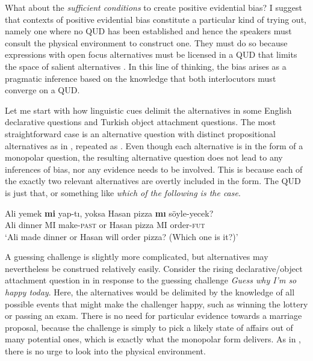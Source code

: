 \documentclass[output=paper,colorlinks,citecolor=brown]{langscibook}
\begin{document}
What about the \textit{sufficient conditions} to create positive evidential bias? I suggest that contexts of positive evidential bias constitute a particular kind of trying out, namely one where no QUD has been established and hence the speakers must consult the physical environment to construct one. They must do so because expressions with open focus alternatives must be licensed in a QUD that limits the space of salient alternatives \citep{Roberts:1996, biezma-rawlins12}. In this line of thinking, the bias arises as a pragmatic inference based on the knowledge that both interlocutors must converge on a QUD.

Let me start with how linguistic cues delimit the alternatives in some English declarative questions and Turkish object attachment questions. The most straightforward case is an alternative question with distinct propositional alternatives as in , repeated as . Even though each alternative is in the form of a monopolar question, the resulting alternative question does not lead to any inferences of bias, nor any evidence needs to be involved. This is because each of the exactly two relevant alternatives are overtly included in the form. The QUD is just that, or something like \textit{which of the following is the case}. 

\ea\label{43}
\gll Ali yemek \textbf{mi} yap-tı, yoksa Hasan pizza \textbf{mı} s\"oyle-yecek?\\
Ali dinner MI make-\textsc{past} or Hasan pizza MI order-\textsc{fut}\\
\glt `Ali made dinner or Hasan will order pizza? (Which one is it?)' 
\z

A guessing challenge is slightly more complicated, but alternatives may nevertheless be construed relatively easily. Consider the rising declarative/object attachment question in  in response to the guessing challenge \textit{Guess why I'm so happy today}. Here, the alternatives would be delimited by the knowledge of all possible events that might make the challenger happy, such as winning the lottery or passing an exam. There is no need for particular evidence towards a marriage proposal, because the challenge is simply to pick a likely state of affairs out of many potential ones, which is exactly what the monopolar form delivers. As in , there is no urge to look into the physical environment.
\end{document}
